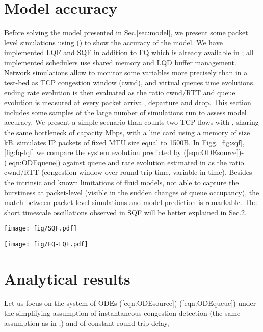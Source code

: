 \documentclass[a4paper,oneside, 11pt]{article}
\begin{document}
\section{Model accuracy}\label{sec:accuracy}
Before solving the model presented in Sec.\ref{sec:model}, we present some
packet level simulations using  (\hspace{-0.2mm}\cite{ns2}) to show the accuracy of the
model.
We have implemented LQF and SQF in addition to FQ which is already available in ;
all implemented schedulers use shared memory and LQD buffer management.
Network simulations allow to monitor some variables more precisely than in a test-bed
as TCP congestion window (cwnd), and virtual queues time evolutions.
ending rate evolution is then evaluated as the ratio cwnd/RTT and queue evolution is
measured at every packet arrival, departure and drop.
This section includes some samples of the large number of simulations
run to assess model accuracy.
We present a simple scenario than counts two TCP flows with , 
sharing the same bottleneck of capacity Mbps, with a line card
using a memory of size kB.  simulates IP packets of fixed MTU size
equal to 1500B.
In Figg. \ref{fig:sqf},\ref{fig:fq-lqf} we compare the system evolution
predicted by (\ref{eqn:ODEsource})-(\ref{eqn:ODEqueue}) against
queue and rate evolution estimated in  as the ratio cwnd/RTT (congestion window over round trip time, variable in time).
Besides the intrinsic and known limitations of fluid models,  not able to
capture the burstiness at packet-level (visible in the sudden changes of queue occupancy),
the match between packet level simulations
and model prediction is remarkable.
The short timescale oscillations
observed in SQF will be better explained in Sec.\ref{sec:Analytical-results}.
\begin{figure*}[!htb]
\centering
\hspace{-2mm}\texttt{[image: fig/SQF.pdf]}
\caption{Time evolution of rates (top) and queues (bottom) under SQF: the model on the left,   on the right.}
\label{fig:sqf}
\end{figure*}
\begin{figure*}[!htb]
\texttt{[image: fig/FQ-LQF.pdf]}
\centering
\caption{Time evolution of rates and queues under FQ (top) and LQF (bottom): the model on the left,   on the right.}
\label{fig:fq-lqf}
\end{figure*}
\section{Analytical results}\label{sec:Analytical-results}
\vspace{-1mm}
Let us focus on the system of ODEs  (\ref{eqn:ODEsource})-(\ref{eqn:ODEqueue}) under the simplifying
assumption of instantaneous congestion detection
(the same assumption as in \cite{baccelli},\cite{carofiglioSplit}) and of constant round trip delay,
\end{document}

